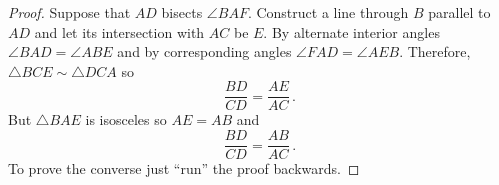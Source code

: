 
\begin{proof}
Suppose that $AD$ bisects $\angle BAF$. Construct a line through $B$ parallel to $AD$ and let its intersection with $AC$ be $E$. By alternate interior angles $\angle BAD=\angle ABE$ and by corresponding angles $\angle FAD=\angle AEB$. Therefore, $\triangle BCE\sim \triangle DCA$ so
\[
\frac{BD}{CD}=\frac{AE}{AC}\,.
\]
But $\triangle BAE$ is isosceles so $AE=AB$ and
\[
\frac{BD}{CD}=\frac{AB}{AC}\,.
\]
To prove the converse just ``run'' the proof backwards.\hqed
\end{proof}

\medskip

\begin{center}
\end{center}


